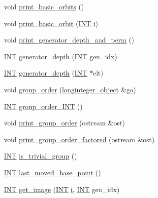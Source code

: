 \begin{DoxyCompactItemize}
\item 
void \mbox{\hyperlink{classsims_ab26955fba9bb5a6fe176b4f12d0a6c5a}{print\+\_\+basic\+\_\+orbits}} ()
\item 
void \mbox{\hyperlink{classsims_ae777e80bb7cef4f757c701173f924a6d}{print\+\_\+basic\+\_\+orbit}} (\mbox{\hyperlink{galois_8h_a09fddde158a3a20bd2dcadb609de11dc}{I\+NT}} \mbox{\hyperlink{alphabet2_8_c_acb559820d9ca11295b4500f179ef6392}{i}})
\item 
void \mbox{\hyperlink{classsims_a4630b82437f49635da45c5fc1953d919}{print\+\_\+generator\+\_\+depth\+\_\+and\+\_\+perm}} ()
\item 
\mbox{\hyperlink{galois_8h_a09fddde158a3a20bd2dcadb609de11dc}{I\+NT}} \mbox{\hyperlink{classsims_acdcef5adbae43ca98568ba1e6aa5b6a2}{generator\+\_\+depth}} (\mbox{\hyperlink{galois_8h_a09fddde158a3a20bd2dcadb609de11dc}{I\+NT}} gen\+\_\+idx)
\item 
\mbox{\hyperlink{galois_8h_a09fddde158a3a20bd2dcadb609de11dc}{I\+NT}} \mbox{\hyperlink{classsims_a0cc71edeac2341268435d5bbeb73fb8d}{generator\+\_\+depth}} (\mbox{\hyperlink{galois_8h_a09fddde158a3a20bd2dcadb609de11dc}{I\+NT}} $\ast$elt)
\item 
void \mbox{\hyperlink{classsims_aa442445175656570fa35febbe790efad}{group\+\_\+order}} (\mbox{\hyperlink{classlonginteger__object}{longinteger\+\_\+object}} \&\mbox{\hyperlink{simeon_8_c_a1516b736c8ebbfb03a9dd7d8826cd9a6}{go}})
\item 
\mbox{\hyperlink{galois_8h_a09fddde158a3a20bd2dcadb609de11dc}{I\+NT}} \mbox{\hyperlink{classsims_a26f7773de3c1fafc2230349ea3e3bfcb}{group\+\_\+order\+\_\+\+I\+NT}} ()
\item 
void \mbox{\hyperlink{classsims_a2fc3bfc40a993e0a6902374465304c0c}{print\+\_\+group\+\_\+order}} (ostream \&ost)
\item 
void \mbox{\hyperlink{classsims_a15c45e963bcaa8e2e073dc48b7c24aca}{print\+\_\+group\+\_\+order\+\_\+factored}} (ostream \&ost)
\item 
\mbox{\hyperlink{galois_8h_a09fddde158a3a20bd2dcadb609de11dc}{I\+NT}} \mbox{\hyperlink{classsims_a2ce587ea215dec9f0f30db8fe3ebfee1}{is\+\_\+trivial\+\_\+group}} ()
\item 
\mbox{\hyperlink{galois_8h_a09fddde158a3a20bd2dcadb609de11dc}{I\+NT}} \mbox{\hyperlink{classsims_ab7549d6212df09ad5fdcc8b5edbe8806}{last\+\_\+moved\+\_\+base\+\_\+point}} ()
\item 
\mbox{\hyperlink{galois_8h_a09fddde158a3a20bd2dcadb609de11dc}{I\+NT}} \mbox{\hyperlink{classsims_ae649dbf5a9440550c1ca4e402c4b4b16}{get\+\_\+image}} (\mbox{\hyperlink{galois_8h_a09fddde158a3a20bd2dcadb609de11dc}{I\+NT}} \mbox{\hyperlink{alphabet2_8_c_acb559820d9ca11295b4500f179ef6392}{i}}, \mbox{\hyperlink{galois_8h_a09fddde158a3a20bd2dcadb609de11dc}{I\+NT}} gen\+\_\+idx)

\end{DoxyCompactItemize}
